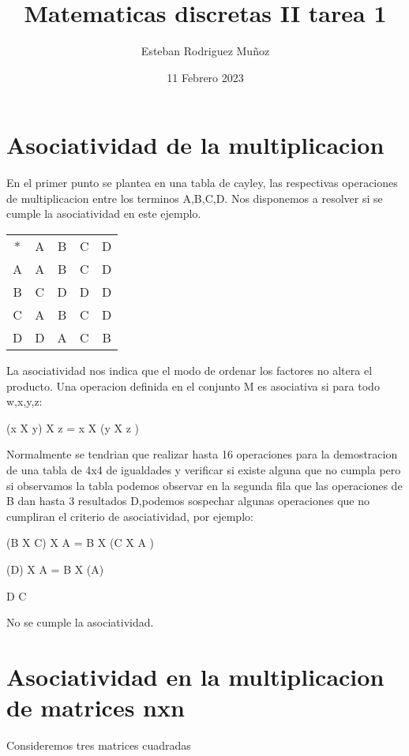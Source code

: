 \documentclass{article}
\title{Matematicas discretas II  tarea 1}
\author{Esteban Rodriguez Muñoz }
\date{11 Febrero 2023}
\begin{document}
\maketitle

\section{Asociatividad de la multiplicacion}
En el primer punto se plantea en una tabla de cayley, las respectivas operaciones de multiplicacion entre  los terminos A,B,C,D. Nos disponemos a resolver si se cumple la asociatividad en este ejemplo.

\medskip
\centering
\noindent\begin{tabular}{ c| c c c c}
     * & A & B & C & D  \\
    \cline{1-5}
    A & A & B & C & D  \\
    B & C & D & D & D  \\
    C & A & B & C & D  \\
    D & D & A & C & B  \\
    
\end{tabular}



\bigskip
La asociatividad nos indica que el modo de ordenar los factores no altera el producto. Una operacion definida en el conjunto M es asociativa si para todo w,x,y,z:
\medskip

\centering (x X y) X z = x X (y X z )
\bigskip

Normalmente se tendrian que realizar hasta 16 operaciones para la demostracion de una tabla de 4x4 de igualdades y verificar si existe alguna que no cumpla pero si observamos la tabla podemos observar en la segunda fila que las operaciones de B dan hasta 3 resultados D,podemos sospechar algunas operaciones que no cumpliran el  criterio de asociatividad, por ejemplo:
\medskip

\centering (B X C) X A = B X (C X A )

\bigskip

\centering (D) X A = B X (A)
\bigskip
{%
\centering D \neq C
\par 
}
\bigskip

\centering No se cumple la asociatividad.


\section{Asociatividad en la multiplicacion de matrices nxn }
Consideremos tres matrices cuadradas
\end{document}
